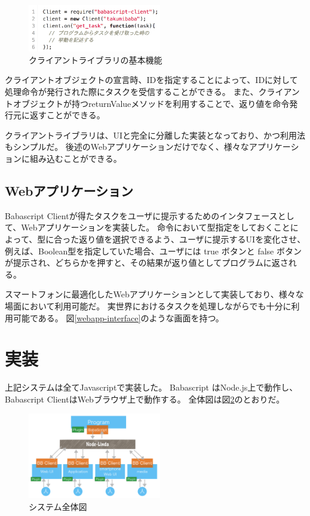 \begin{figure}[h]
  \centering
  \includegraphics[width=220px]{./images/client.png}
  \caption{クライアントライブラリの基本機能 }
  \label{client}
\end{figure}

クライアントオブジェクトの宣言時、IDを指定することによって、IDに対して処理命令が発行された際にタスクを受信することができる。
また、クライアントオブジェクトが持つreturnValueメソッドを利用することで、返り値を命令発行元に返すことができる。

クライアントライブラリは、UIと完全に分離した実装となっており、かつ利用法もシンプルだ。
後述のWebアプリケーションだけでなく、様々なアプリケーションに組み込むことができる。

\subsection{Webアプリケーション}\label{webux30a2ux30d7ux30eaux30b1ux30fcux30b7ux30e7ux30f3}

Babascript
Clientが得たタスクをユーザに提示するためのインタフェースとして、Webアプリケーションを実装した。
命令において型指定をしておくことによって、型に合った返り値を選択できるよう、ユーザに提示するUIを変化させ、
例えば、Boolean型を指定していた場合、ユーザには true ボタンと false
ボタンが提示され、どちらかを押すと、その結果が返り値としてプログラムに返される。

スマートフォンに最適化したWebアプリケーションとして実装しており、様々な場面において利用可能だ。
実世界におけるタスクを処理しながらでも十分に利用可能である。
図\ref{webapp-interface}のような画面を持つ。

\section{実装}\label{ux5b9fux88c5}

上記システムは全てJavascriptで実装した。 Babascript
はNode.js上で動作し、Babascript ClientはWebブラウザ上で動作する。
全体図は図\ref{system}のとおりだ。

\begin{figure}[h]
  \includegraphics[width=220px]{./images/system.png}
  \caption{システム全体図}  
  \label{system}
\end{figure}


